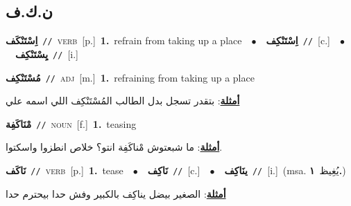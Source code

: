 \documentclass[10pt,a4paper,twoside]{article} %
\begin{document}
\begin{multicols}{2}
\vspace{-3mm}
\subsection*{\color{blue}\foreignlanguage{arabic}{ن.ك.ف}\color{blue}{}} 

{\setlength\topsep{0pt}\textbf{\foreignlanguage{arabic}{اِسْتَنْكَف}}\ {\color{gray}\texttt{//}\color{black}}\ \textsc{verb}\ [p.]\ \textbf{1.}~refrain from taking up a place\ \ $\bullet$\ \ \setlength\topsep{0pt}\textbf{\foreignlanguage{arabic}{اِسْتَنْكِف}}\ {\color{gray}\texttt{//}\color{black}}\ [c.]\ \ $\bullet$\ \ \setlength\topsep{0pt}\textbf{\foreignlanguage{arabic}{يِسْتَنْكِف}}\ {\color{gray}\texttt{//}\color{black}}\ [i.]\ } \vspace{2mm}

{\setlength\topsep{0pt}\textbf{\foreignlanguage{arabic}{مُسْتَنْكِف}}\ {\color{gray}\texttt{//}\color{black}}\ \textsc{adj}\ [m.]\ \textbf{1.}~refraining from taking up a place\  \begin{flushright}\color{gray}\foreignlanguage{arabic}{\textbf{\underline{\foreignlanguage{arabic}{أمثلة}}}: بتقدر تسجل بدل الطالب المُسْتَنْكِف اللي اسمه علي}\end{flushright}\color{black}} \vspace{2mm}

{\setlength\topsep{0pt}\textbf{\foreignlanguage{arabic}{مْنَاكَفِة}}\ {\color{gray}\texttt{//}\color{black}}\ \textsc{noun}\ [f.]\ \textbf{1.}~teasing\  \begin{flushright}\color{gray}\foreignlanguage{arabic}{\textbf{\underline{\foreignlanguage{arabic}{أمثلة}}}: ما شبعتوش مْناكَفِة انتو؟ خلاص انطزوا واسكتوا.}\end{flushright}\color{black}} \vspace{2mm}

{\setlength\topsep{0pt}\textbf{\foreignlanguage{arabic}{نَاكَف}}\ {\color{gray}\texttt{//}\color{black}}\ \textsc{verb}\ [p.]\ \textbf{1.}~tease\ \ $\bullet$\ \ \setlength\topsep{0pt}\textbf{\foreignlanguage{arabic}{نَاكِف}}\ {\color{gray}\texttt{//}\color{black}}\ [c.]\ \ $\bullet$\ \ \setlength\topsep{0pt}\textbf{\foreignlanguage{arabic}{ينَاكِف}}\ {\color{gray}\texttt{//}\color{black}}\ [i.]\ \color{gray}(msa. \foreignlanguage{arabic}{يُغِيظ}~\foreignlanguage{arabic}{\textbf{١.}})\color{black}\  \begin{flushright}\color{gray}\foreignlanguage{arabic}{\textbf{\underline{\foreignlanguage{arabic}{أمثلة}}}: الصغير بيضل يناكِف بالكبير وفش حدا بيحترم حدا}\end{flushright}\color{black}} \vspace{2mm}


\end{multicols}
\end{document}
